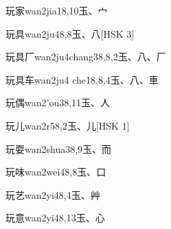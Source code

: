 \begin{EntryWithPhonetic}{玩家}{wan2jia1}{8,10}{⽟、⼧}
\end{EntryWithPhonetic}

\begin{EntryWithPhonetic}{玩具}{wan2ju4}{8,8}{⽟、⼋}[HSK 3]
\end{EntryWithPhonetic}

\begin{EntryWithPhonetic}{玩具厂}{wan2ju4chang3}{8,8,2}{⽟、⼋、⼚}
\end{EntryWithPhonetic}

\begin{EntryWithPhonetic}{玩具车}{wan2ju4 che1}{8,8,4}{⽟、⼋、⾞}
\end{EntryWithPhonetic}

\begin{EntryWithPhonetic}{玩偶}{wan2'ou3}{8,11}{⽟、⼈}
\end{EntryWithPhonetic}

\begin{EntryWithPhonetic}{玩儿}{wan2r5}{8,2}{⽟、⼉}[HSK 1]
\end{EntryWithPhonetic}

\begin{EntryWithPhonetic}{玩耍}{wan2shua3}{8,9}{⽟、⽽}
\end{EntryWithPhonetic}

\begin{EntryWithPhonetic}{玩味}{wan2wei4}{8,8}{⽟、⼝}
\end{EntryWithPhonetic}

\begin{EntryWithPhonetic}{玩艺}{wan2yi4}{8,4}{⽟、⾋}
\end{EntryWithPhonetic}

\begin{EntryWithPhonetic}{玩意}{wan2yi4}{8,13}{⽟、⼼}
\end{EntryWithPhonetic}

